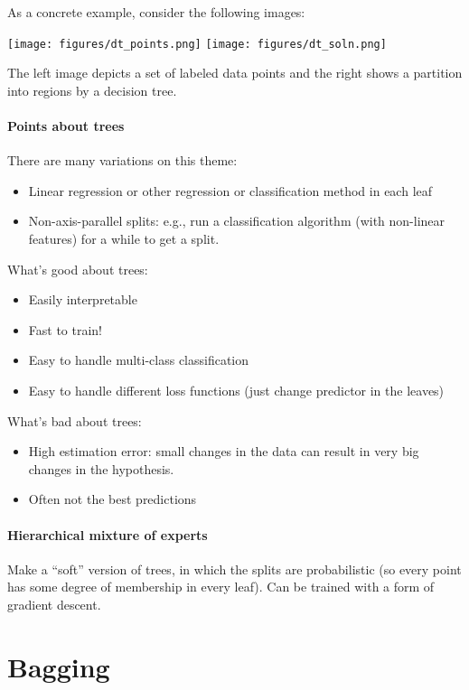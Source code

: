 \noindent
As a concrete example, consider the following images:
\begin{center}
\texttt{[image: figures/dt\_points.png]}
\texttt{[image: figures/dt\_soln.png]}
\end{center}
The left image depicts a set of labeled data points and the right shows a partition into regions by a decision tree.

\paragraph*{Points about trees}

There are many variations on this theme:
\begin{itemize}
\item Linear regression or other regression or classification
  method in each leaf
\item Non-axis-parallel splits: e.g., run a classification algorithm (with non-linear features) for a while to
  get a split.
\end{itemize}

\noindent What's good about trees:
\begin{itemize}
\item Easily interpretable
\item Fast to train!
\item Easy to handle multi-class classification
\item Easy to handle different loss functions (just change predictor
  in the leaves)
\end{itemize}
What's bad about trees:
\begin{itemize}
\item High estimation error:  small changes in the data can result in very big
  changes in the hypothesis.
\item Often not the best predictions
\end{itemize}

\paragraph*{Hierarchical mixture of experts}  Make a ``soft'' version
of trees, in which the splits are probabilistic (so every point has
some degree of membership in every leaf).  Can be trained with a form
of gradient descent.

\section{Bagging}
\label{sec:np_bagging}

